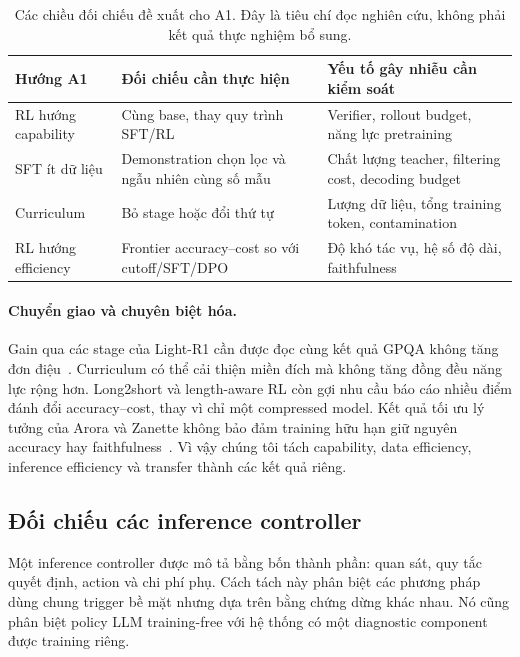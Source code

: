 \begin{table}[htbp]
\centering\small
\begin{tabularx}{\textwidth}{>{\raggedright\arraybackslash}p{2.6cm}>{\raggedright\arraybackslash}X>{\raggedright\arraybackslash}X}
\toprule
\textbf{Hướng A1} & \textbf{Đối chiếu cần thực hiện} & \textbf{Yếu tố gây nhiễu cần kiểm soát} \\
\midrule
RL hướng capability & Cùng base, thay quy trình SFT/RL & Verifier, rollout budget, năng lực pretraining \\
SFT ít dữ liệu & Demonstration chọn lọc và ngẫu nhiên cùng số mẫu & Chất lượng teacher, filtering cost, decoding budget \\
Curriculum & Bỏ stage hoặc đổi thứ tự & Lượng dữ liệu, tổng training token, contamination \\
RL hướng efficiency & Frontier accuracy--cost so với cutoff/SFT/DPO & Độ khó tác vụ, hệ số độ dài, faithfulness \\
\bottomrule
\end{tabularx}
\caption{Các chiều đối chiếu đề xuất cho A1. Đây là tiêu chí đọc nghiên cứu, không phải kết quả thực nghiệm bổ sung.}
\label{tab:a1_comparison}
\end{table}

\paragraph{Chuyển giao và chuyên biệt hóa.}
Gain qua các stage của Light-R1 cần được đọc cùng kết quả GPQA không tăng đơn điệu~\cite{rra1_light_r1}. Curriculum có thể cải thiện miền đích mà không tăng đồng đều năng lực rộng hơn. Long2short và length-aware RL còn gợi nhu cầu báo cáo nhiều điểm đánh đổi accuracy--cost, thay vì chỉ một compressed model. Kết quả tối ưu lý tưởng của Arora và Zanette không bảo đảm training hữu hạn giữ nguyên accuracy hay faithfulness~\cite{rra1_efficient_rl}. Vì vậy chúng tôi tách capability, data efficiency, inference efficiency và transfer thành các kết quả riêng.

\subsection{Đối chiếu các inference controller}
\label{subsec:a2_comparison}

Một inference controller được mô tả bằng bốn thành phần: quan sát, quy tắc quyết định, action và chi phí phụ. Cách tách này phân biệt các phương pháp dùng chung trigger bề mặt nhưng dựa trên bằng chứng dừng khác nhau. Nó cũng phân biệt policy LLM training-free với hệ thống có một diagnostic component được training riêng.

